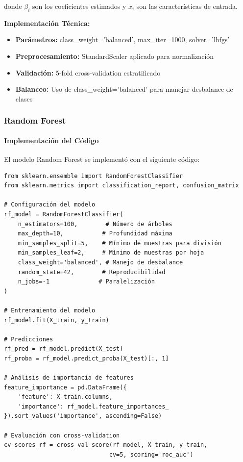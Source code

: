 \documentclass[12pt,letterpaper]{article}
\begin{document}
donde $\beta_i$ son los coeficientes estimados y $x_i$ son las características de entrada.

\textbf{Implementación Técnica:}
\begin{itemize}
    \item \textbf{Parámetros:} class\_weight='balanced', max\_iter=1000, solver='lbfgs'
    \item \textbf{Preprocesamiento:} StandardScaler aplicado para normalización
    \item \textbf{Validación:} 5-fold cross-validation estratificado
    \item \textbf{Balanceo:} Uso de class\_weight='balanced' para manejar desbalance de clases
\end{itemize}

\subsubsection{Random Forest}

\paragraph{Implementación del Código}

El modelo Random Forest se implementó con el siguiente código:

\begin{verbatim}
from sklearn.ensemble import RandomForestClassifier
from sklearn.metrics import classification_report, confusion_matrix

# Configuración del modelo
rf_model = RandomForestClassifier(
    n_estimators=100,        # Número de árboles
    max_depth=10,           # Profundidad máxima
    min_samples_split=5,    # Mínimo de muestras para división
    min_samples_leaf=2,     # Mínimo de muestras por hoja
    class_weight='balanced', # Manejo de desbalance
    random_state=42,        # Reproducibilidad
    n_jobs=-1              # Paralelización
)

# Entrenamiento del modelo
rf_model.fit(X_train, y_train)

# Predicciones
rf_pred = rf_model.predict(X_test)
rf_proba = rf_model.predict_proba(X_test)[:, 1]

# Análisis de importancia de features
feature_importance = pd.DataFrame({
    'feature': X_train.columns,
    'importance': rf_model.feature_importances_
}).sort_values('importance', ascending=False)

# Evaluación con cross-validation
cv_scores_rf = cross_val_score(rf_model, X_train, y_train, 
                              cv=5, scoring='roc_auc')
\end{verbatim}
\end{document}
